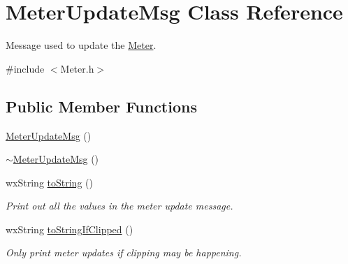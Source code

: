 \hypertarget{class_meter_update_msg}{}\section{Meter\+Update\+Msg Class Reference}
\label{class_meter_update_msg}


Message used to update the \hyperlink{class_meter}{Meter}.  




{\ttfamily \#include $<$Meter.\+h$>$}

\subsection*{Public Member Functions}
\begin{DoxyCompactItemize}
\item 
\hyperlink{class_meter_update_msg_a6736d3e6a768c350458dc7751dfa6277}{Meter\+Update\+Msg} ()
\item 
\hyperlink{class_meter_update_msg_adc7060b0ebaeab7006d0a1084f6cf775}{$\sim$\+Meter\+Update\+Msg} ()
\item 
wx\+String \hyperlink{class_meter_update_msg_aae228879729846fe7ca7f0c7e176d17f}{to\+String} ()
\begin{DoxyCompactList}\small\item\em Print out all the values in the meter update message. \end{DoxyCompactList}\item 
wx\+String \hyperlink{class_meter_update_msg_a8479d3be570d3faee502cf21dc0cec64}{to\+String\+If\+Clipped} ()
\begin{DoxyCompactList}\small\item\em Only print meter updates if clipping may be happening. \end{DoxyCompactList}\end{DoxyCompactItemize}
